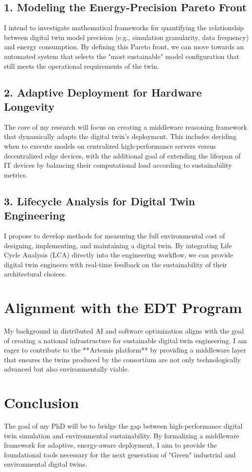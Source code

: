 \documentclass[a4paper,11pt]{article}
\begin{document}
\subsection{1. Modeling the Energy-Precision Pareto Front}
I intend to investigate mathematical frameworks for quantifying the relationship between digital twin model precision (e.g., simulation granularity, data frequency) and energy consumption. By defining this Pareto front, we can move towards an automated system that selects the "most sustainable" model configuration that still meets the operational requirements of the twin.

\subsection{2. Adaptive Deployment for Hardware Longevity}
The core of my research will focus on creating a middleware reasoning framework that dynamically adapts the digital twin's deployment. This includes deciding when to execute models on centralized high-performance servers versus decentralized edge devices, with the additional goal of extending the lifespan of IT devices by balancing their computational load according to sustainability metrics.

\subsection{3. Lifecycle Analysis for Digital Twin Engineering}
I propose to develop methods for measuring the full environmental cost of designing, implementing, and maintaining a digital twin. By integrating Life Cycle Analysis (LCA) directly into the engineering workflow, we can provide digital twin engineers with real-time feedback on the sustainability of their architectural choices.

\section{Alignment with the EDT Program}
My background in distributed AI and software optimization aligns with the goal of creating a national infrastructure for sustainable digital twin engineering. I am eager to contribute to the **Artemis platform** by providing a middleware layer that ensures the twins produced by the consortium are not only technologically advanced but also environmentally viable.

\section{Conclusion}
The goal of my PhD will be to bridge the gap between high-performance digital twin simulation and environmental sustainability. By formalizing a middleware framework for adaptive, energy-aware deployment, I aim to provide the foundational tools necessary for the next generation of "Green" industrial and environmental digital twins.
\end{document}
